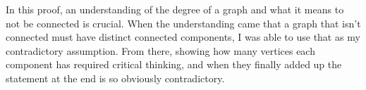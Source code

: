 \documentclass[12pt]{article}
\begin{document}
\par
In this proof, an understanding of the degree of a graph and what it means to not be connected is crucial. When the understanding came that a graph that isn't connected must have distinct connected components, I was able to use that as my contradictory assumption. From there, showing how many vertices each component has required critical thinking, and when they finally added up the statement at the end is so obviously contradictory.
\end{document}
